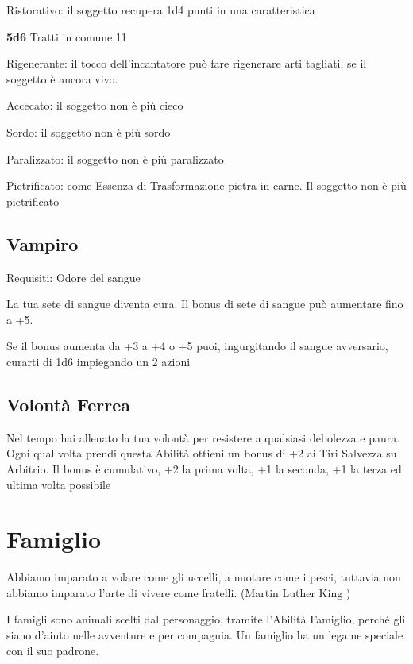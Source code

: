 \documentclass[a4paper,11pt,twoside,openany]{book}
\begin{document}
Ristorativo: il soggetto recupera 1d4 punti in una caratteristica

\textbf{5d6} Tratti in comune 11

Rigenerante: il tocco dell'incantatore può fare rigenerare arti tagliati, se il soggetto è ancora vivo.

Accecato: il soggetto non è più cieco

Sordo: il soggetto non è più sordo

Paralizzato: il soggetto non è più paralizzato

Pietrificato: come Essenza di Trasformazione pietra in carne. Il soggetto non è più pietrificato

\subsection{Vampiro}

Requisiti: Odore del sangue

La tua sete di sangue diventa cura. Il bonus di sete di sangue può aumentare fino a +5.

Se il bonus aumenta da +3 a +4 o +5 puoi, ingurgitando il sangue avversario, curarti di 1d6 impiegando un 2 azioni

\subsection{Volontà Ferrea}

Nel tempo hai allenato la tua volontà per resistere a qualsiasi debolezza e paura. Ogni qual volta prendi questa Abilità ottieni un bonus di +2 ai Tiri Salvezza su Arbitrio. Il bonus è cumulativo, +2 la prima volta, +1 la seconda, +1 la terza ed ultima volta possibile

\pagebreak

\section{Famiglio}

\label{famiglio}
\begin{tcolorbox}[enhanced,arc=5pt,boxrule=0.3pt]{
		Abbiamo imparato a volare come gli uccelli, a nuotare come i pesci, tuttavia non abbiamo imparato l'arte di vivere come fratelli. (Martin Luther King )}\end{tcolorbox}\medskip

I famigli sono animali scelti dal personaggio, tramite l'Abilità Famiglio, perché gli siano d'aiuto nelle avventure e per compagnia. Un famiglio ha un legame speciale con il suo padrone.
\end{document}
